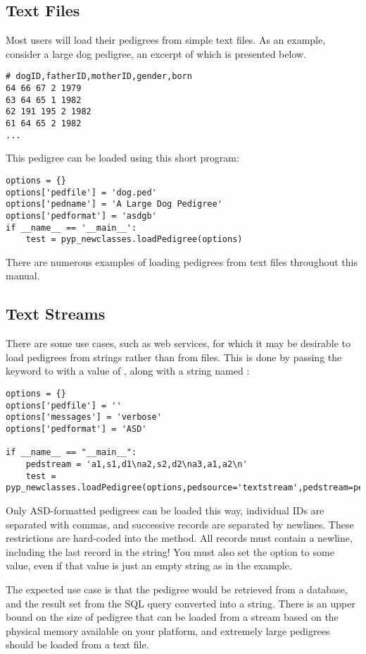 \subsection{Text Files}\label{sec:io-input-text-files}
Most users will load their pedigrees from simple text files. As an example, consider a large dog pedigree, an excerpt of which is presented below.
\begin{verbatim}
# dogID,fatherID,motherID,gender,born
64 66 67 2 1979
63 64 65 1 1982
62 191 195 2 1982
61 64 65 2 1982
...
\end{verbatim}
This pedigree can be loaded using this short program:
\begin{verbatim}
options = {}
options['pedfile'] = 'dog.ped'
options['pedname'] = 'A Large Dog Pedigree'
options['pedformat'] = 'asdgb'
if __name__ == '__main__':
    test = pyp_newclasses.loadPedigree(options)
\end{verbatim}
There are numerous examples of loading pedigrees from text files throughout this manual.

\subsection{Text Streams}\label{sec:io-input-text-streams}
There are some use cases, such as web services, for which it may be desirable to load pedigrees from strings rather than from files. This is done by passing the  keyword to  with a value of , along with a string named :
\begin{verbatim}
options = {}
options['pedfile'] = ''
options['messages'] = 'verbose'
options['pedformat'] = 'ASD'

if __name__ == "__main__":
    pedstream = 'a1,s1,d1\na2,s2,d2\na3,a1,a2\n'
    test = pyp_newclasses.loadPedigree(options,pedsource='textstream',pedstream=pedstream)
\end{verbatim}
Only ASD-formatted pedigrees can be loaded this way, individual IDs are separated with commas, and successive records are separated by newlines. These restrictions are hard-coded into the  method. All records must contain a newline, including the last record in the string! You must also set the  option to some value, even if that value is just an empty string as in the example.

The expected use case is that the pedigree would be retrieved from a database, and the result set from the SQL query converted into a string. There is an upper bound on the size of pedigree that can be loaded from a stream based on the physical memory available on your platform, and extremely large pedigrees should be loaded from a text file. 

